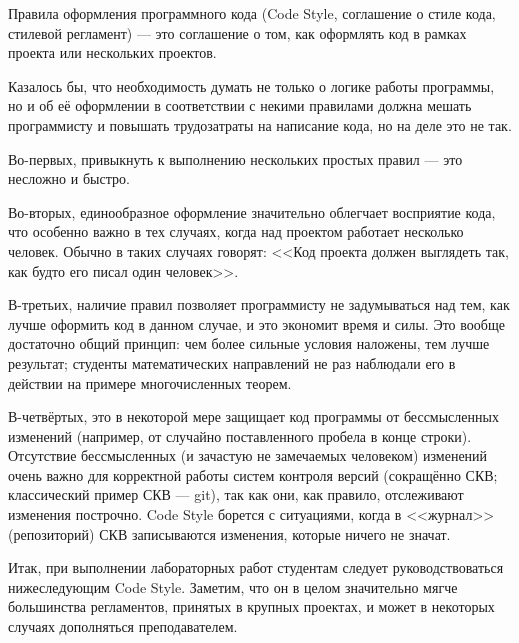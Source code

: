 Правила оформления программного кода (Code Style, соглашение о стиле кода, стилевой регламент) --- это соглашение о том, как оформлять код в рамках проекта или нескольких проектов.

Казалось бы, что необходимость думать не только о логике работы программы, но и об её оформлении в соответствии с некими правилами должна мешать программисту и повышать трудозатраты на написание кода, но на деле это не так.

Во-первых, привыкнуть к выполнению нескольких простых правил --- это несложно и быстро.

Во-вторых, единообразное оформление значительно облегчает восприятие кода, что особенно важно в тех случаях,
когда над проектом работает несколько человек.
Обычно в таких случаях говорят: <<Код проекта должен выглядеть так, как будто его писал один человек>>.

В-третьих, наличие правил позволяет программисту не задумываться над тем, как лучше оформить код в данном случае, и это экономит время и силы.
Это вообще достаточно общий принцип: чем более сильные условия наложены, тем лучше результат;
студенты математических направлений не раз наблюдали его в действии на примере многочисленных теорем.

В-четвёртых, это в некоторой мере защищает код программы от бессмысленных изменений (например, от случайно поставленного пробела в конце строки).
Отсутствие бессмысленных (и зачастую не замечаемых человеком) изменений очень важно для корректной работы систем контроля версий (сокращённо СКВ; классический пример СКВ --- git), так как они, как правило, отслеживают изменения построчно.
Code Style борется с ситуациями, когда в <<журнал>> (репозиторий) СКВ записываются изменения, которые ничего не значат.

Итак, при выполнении лабораторных работ студентам следует руководствоваться нижеследующим Code Style.
Заметим, что он в целом значительно мягче большинства регламентов, принятых в крупных проектах,
и может в некоторых случаях дополняться преподавателем.


